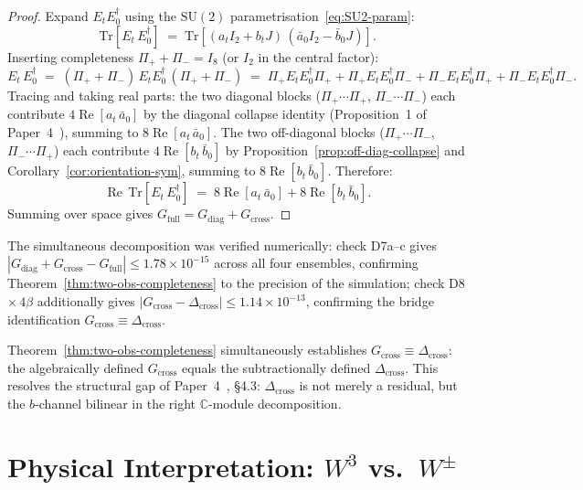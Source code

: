 \documentclass[12pt]{article}
\numberwithin{equation}{section}
\theoremstyle{plain}
\theoremstyle{definition}
\theoremstyle{remark}
\newcommand{\su}{\mathrm{SU}}              %
\newcommand{\tr}{\mathrm{Tr}}              %
\newcommand{\Cplx}{\mathbb{C}}             %
\newcommand{\Gdiag}{G_{\mathrm{diag}}}     %
\newcommand{\Gcross}{G_{\mathrm{cross}}}   %
\newcommand{\Gfull}{G_{\mathrm{full}}}     %
\newcommand{\Dcross}{\Delta_{\mathrm{cross}}}  %
\newcommand{\Pip}{\Pi_{+}}                 %
\newcommand{\Pim}{\Pi_{-}}                 %
\begin{document}
	\begin{proof}
		Expand $E_t E_0^{\dagger}$ using the $\su(2)$
		parametrisation~\eqref{eq:SU2-param}:
		\[
		\tr\!\left[E_t\, E_0^{\dagger}\right]
		\;=\; \tr\!\left[(a_t I_2 + b_t J)\,
		(\bar{a}_0 I_2 - \bar{b}_0 J)\right].
		\]
		Inserting completeness $\Pip + \Pim = I_8$ (or $I_2$ in the
		central factor):
		\[
		E_t\, E_0^{\dagger}
		\;=\; (\Pip + \Pim)\, E_t E_0^{\dagger}\,(\Pip + \Pim)
		\;=\; \Pip E_t E_0^{\dagger}\Pip
		+\Pip E_t E_0^{\dagger}\Pim
		+\Pim E_t E_0^{\dagger}\Pip
		+\Pim E_t E_0^{\dagger}\Pim.
		\]
		Tracing and taking real parts: the two diagonal blocks
		($\Pip\cdots\Pip$, $\Pim\cdots\Pim$) each contribute
		$4\operatorname{Re}[a_t\,\bar{a}_0]$ by the diagonal collapse
		identity (Proposition~1 of Paper~4~\cite{FirestoneP4}), summing to
		$8\operatorname{Re}[a_t\,\bar{a}_0]$.  The two off-diagonal blocks
		($\Pip\cdots\Pim$, $\Pim\cdots\Pip$) each contribute
		$4\operatorname{Re}[b_t\,\bar{b}_0]$ by
		Proposition~\ref{prop:off-diag-collapse} and
		Corollary~\ref{cor:orientation-sym}, summing to
		$8\operatorname{Re}[b_t\,\bar{b}_0]$.  Therefore:
		\[
		\operatorname{Re}\,\tr\!\left[E_t\, E_0^{\dagger}\right]
		\;=\; 8\operatorname{Re}[a_t\,\bar{a}_0]
		+ 8\operatorname{Re}[b_t\,\bar{b}_0].
		\]
		Summing over space gives $\Gfull = \Gdiag + \Gcross$.
	\end{proof}
	
	The simultaneous decomposition was verified numerically:
	check D7a--c gives $|\Gdiag + \Gcross - \Gfull|\leq 1.78\times 10^{-15}$
	across all four ensembles, confirming
	Theorem~\ref{thm:two-obs-completeness} to the precision of the
	simulation; check D8\,$\times\,4\beta$ additionally gives
	$|\Gcross - \Dcross|\leq 1.14\times 10^{-13}$, confirming the bridge
	identification $\Gcross\equiv\Dcross$.
	
	Theorem~\ref{thm:two-obs-completeness} simultaneously establishes
	$\Gcross \equiv \Dcross$: the algebraically defined $\Gcross$ equals
	the subtractionally defined $\Dcross$.  This resolves the structural
	gap of Paper~4~\cite{FirestoneP4}, \S4.3: $\Dcross$ is not merely a
	residual, but the $b$-channel bilinear in the right $\Cplx$-module
	decomposition.
	
	\section{Physical Interpretation:
		\texorpdfstring{$W^{3}$}{W3} vs.\ \texorpdfstring{$W^{\pm}$}{W+-}}
	\label{sec:physical-interp}
	
\end{document}

